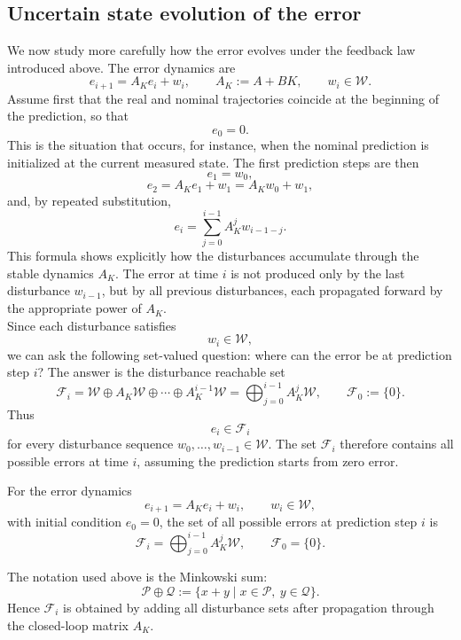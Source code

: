 \subsection{Uncertain state evolution of the error}

We now study more carefully how the error evolves under the feedback law introduced above. The
error dynamics are
\[
    e_{i+1}=A_K e_i+w_i,
    \qquad
    A_K:=A+BK,
    \qquad
    w_i\in\mathcal W.
\]
Assume first that the real and nominal trajectories coincide at the beginning of the prediction,
so that
\[
    e_0=0.
\]
This is the situation that occurs, for instance, when the nominal prediction is initialized at the
current measured state. The first prediction steps are then
\[
    e_1=w_0,
\]
\[
    e_2=A_K e_1+w_1=A_Kw_0+w_1,
\]
and, by repeated substitution,
\[
    e_i
    =
    \sum_{j=0}^{i-1}A_K^j w_{i-1-j}.
\]
This formula shows explicitly how the disturbances accumulate through the stable dynamics
\(A_K\). The error at time \(i\) is not produced only by the last disturbance \(w_{i-1}\), but by
all previous disturbances, each propagated forward by the appropriate power of \(A_K\).\\
Since each disturbance satisfies
\[
    w_i\in\mathcal W,
\]
we can ask the following set-valued question: where can the error be at prediction step \(i\)?
The answer is the disturbance reachable set
\[
    \mathcal F_i
    =
    \mathcal W\oplus A_K\mathcal W\oplus\cdots\oplus A_K^{i-1}\mathcal W
    =
    \bigoplus_{j=0}^{i-1}A_K^j\mathcal W,
    \qquad
    \mathcal F_0:=\{0\}.
\]
Thus
\[
    e_i\in\mathcal F_i
\]
for every disturbance sequence \(w_0,\ldots,w_{i-1}\in\mathcal W\). The set \(\mathcal F_i\)
therefore contains all possible errors at time \(i\), assuming the prediction starts from zero
error.

\begin{theorembox}
For the error dynamics
\[
    e_{i+1}=A_Ke_i+w_i,
    \qquad w_i\in\mathcal W,
\]
with initial condition \(e_0=0\), the set of all possible errors at prediction step \(i\) is
\[
    \mathcal F_i
    =
    \bigoplus_{j=0}^{i-1}A_K^j\mathcal W,
    \qquad
    \mathcal F_0=\{0\}.
\]
\end{theorembox}

The notation used above is the Minkowski sum:
\[
    \mathcal P\oplus\mathcal Q
    :=
    \{x+y\mid x\in\mathcal P,\ y\in\mathcal Q\}.
\]
Hence \(\mathcal F_i\) is obtained by adding all disturbance sets after propagation through the
closed-loop matrix \(A_K\).

